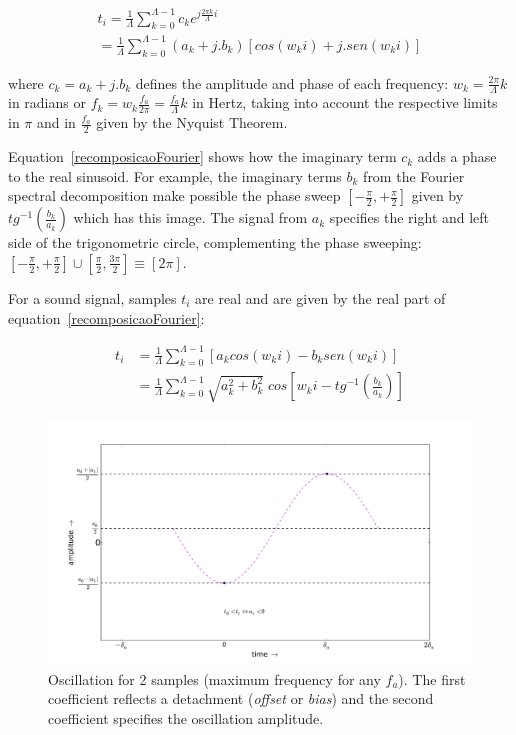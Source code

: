 \documentclass[
 aip,
 jmp,
 amsmath,amssymb,
 reprint,
]{revtex4-1}
\begin{document}
\begin{multline}\label{recomposicaoFourier}
t_i = \frac{1}{\Lambda}\sum_{k=0}^{\Lambda-1}c_ke^{j \frac{2\pi k}{\Lambda} i } \\ = \frac{1}{\Lambda}\sum_{k=0}^{\Lambda-1}(a_k+ j . b_k)\left[cos(w_k i)   +j . sen(w_k i)\right]
\end{multline}

where $c_k = a_k + j . b_k$ defines the amplitude and phase of each frequency: $w_k=\frac{2\pi}{\Lambda}k$ in radians or $f_k=w_k\frac{f_a}{2\pi}=\frac{f_a}{\Lambda}k$ in Hertz, taking into account the respective limits in $\pi$ and in $\frac{f_a}{2}$ given by the Nyquist Theorem. 

Equation~\ref{recomposicaoFourier} shows how the imaginary term $c_k$ adds a phase to the real sinusoid. For example, the imaginary terms $b_k$ from the Fourier spectral decomposition make possible the phase sweep $\left[-\frac{\pi}{2},+\frac{\pi}{2}\right]$ given by $tg^{-1}\left(\frac{b_k}{a_k}\right)$ which has this image. The signal from $a_k$ specifies the right and left side of the trigonometric circle, complementing the phase sweeping: $\left[-\frac{\pi}{2},+\frac{\pi}{2}\right] \cup \left[\frac{\pi}{2},\frac{3\pi}{2}\right]\equiv [2\pi]$.

For a sound signal, samples $t_i$ are real and are given by the real part of equation~\ref{recomposicaoFourier}:

\begin{equation}\label{moduloEfase}
\begin{split}
t_i& = \frac{1}{\Lambda}\sum_{k=0}^{\Lambda-1}\left[a_k cos(w_k i) -b_k sen(w_k i)\right] \\
   & = \frac{1}{\Lambda}\sum_{k=0}^{\Lambda-1}\sqrt{a_k^2 + b_k^2} \; cos\left[w_k i - tg^{-1}\left(\frac{b_k}{a_k}\right)\right]
\end{split}
\end{equation}

 \begin{figure}[h!]
     \centering
         \includegraphics[width=\columnwidth]{figures/amostras2c__}
     \caption{Oscillation for 2 samples (maximum frequency for any $f_a$). The first coefficient reflects a detachment (\emph{offset} or \emph{bias}) and the second coefficient specifies the oscillation amplitude.}
         \label{fig:amostras2}
 \end{figure}
\end{document}
